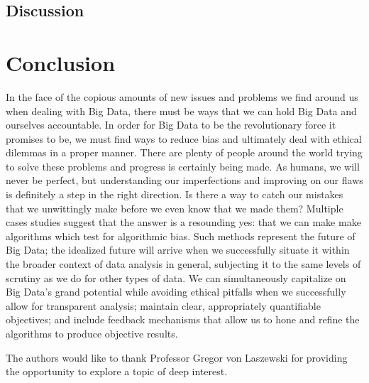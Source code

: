 \documentclass[sigconf]{acmart}
\begin{document}
\subsection{Discussion}

\section{Conclusion}

In the face of the copious amounts of new issues and problems we find around us when dealing with Big Data, there must be ways that we can hold Big Data and ourselves accountable. In order for Big Data to be the revolutionary force it promises to be, we must find ways to reduce bias and ultimately deal with ethical dilemmas in a proper manner. There are plenty of people around the world trying to solve these problems and progress is certainly being made. As humans, we will never be perfect, but understanding our imperfections and improving on our flaws is definitely a step in the right direction. Is there a way to catch our mistakes that we unwittingly make before we even know that we made them? Multiple cases studies suggest that the answer is a resounding yes: that we can make make algorithms which test for algorithmic bias. Such methods represent the future of Big Data; the idealized future will arrive when we successfully situate it within the broader context of data analysis in general, subjecting it to the same levels of scrutiny as we do for other types of data. We can simultaneously capitalize on Big Data's grand potential while avoiding ethical pitfalls when we successfully allow for transparent analysis; maintain clear, appropriately quantifiable objectives; and include feedback mechanisms that allow us to hone and refine the algorithms to produce objective results. 


\begin{acks}
The authors would like to thank Professor Gregor von Laszewski for providing the opportunity to explore a topic of deep interest.

\end{acks}



 
\end{document}
